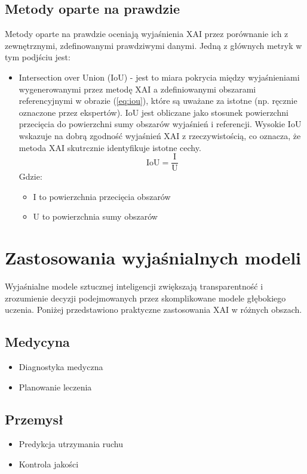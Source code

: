 \subsection*{Metody oparte na prawdzie}
Metody oparte na prawdzie oceniają wyjaśnienia XAI przez porównanie ich z zewnętrznymi, zdefinowanymi prawdziwymi danymi. Jedną z głównych metryk w tym podjściu jest:
\begin{itemize}
	\item Intersection over Union (IoU)\cite{9093360, XAIevalCNN} - jest to miara pokrycia między wyjaśnieniami wygenerowanymi przez metodę XAI a zdefiniowanymi obszarami referencyjnymi w obrazie (\ref{eq:iou}), które są uważane za istotne (np. ręcznie oznaczone przez ekspertów).
	      IoU jest obliczane jako stosunek powierzchni przecięcia do powierzchni sumy obszarów wyjaśnień i referencji. Wysokie IoU wskazuje na dobrą zgodność wyjaśnień XAI z rzeczywistością, co oznacza, że metoda XAI skutrcznie identyfikuje istotne cechy.
	      \begin{equation}
		      \text{IoU} = \frac{\text{I}}{\text{U}}
		      \label{eq:iou}
	      \end{equation}
	      Gdzie:
	      \begin{itemize}
		      \item I to powierzchnia przecięcia obszarów
		      \item U to powierzchnia sumy obszarów
	      \end{itemize}
\end{itemize}

\section*{Zastosowania wyjaśnialnych modeli}

Wyjaśnialne modele sztucznej inteligencji zwiększają transparentność i zrozumienie decyzji podejmowanych przez skomplikowane modele głębokiego uczenia.
Poniżej przedstawiono praktyczne zastosowania XAI w różnych obszach.
\subsection*{Medycyna}
\begin{itemize}
	\item Diagnostyka medyczna\cite{medicalXAIexample}
	\item Planowanie leczenia\cite{medicalXAIexampletret}
\end{itemize}
\subsection*{Przemysł}
\begin{itemize}
	\item Predykcja utrzymania ruchu
	\item Kontrola jakości\cite{qualityXAIexample}
\end{itemize}
